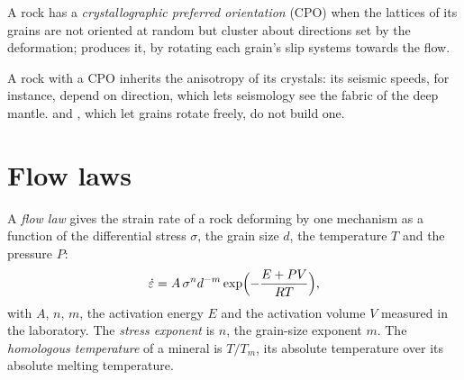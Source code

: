 \begin{definition}\label{def:b3:deformation-mechanisms:cpo}
A rock has a \emph{crystallographic preferred orientation}
(CPO) when the lattices of its grains are not oriented
at random but cluster about directions set by the deformation;  produces it, by rotating each grain's slip systems towards the flow.
\end{definition}

A rock with a CPO inherits the anisotropy of its crystals: its seismic speeds,
for instance, depend on direction, which lets seismology see the fabric of
the deep mantle.  and , which let grains
rotate freely, do not build one.

\section{Flow laws}

\begin{definition}\label{def:b3:deformation-mechanisms:flow-law}
A \emph{flow law} gives the strain rate of a rock deforming by
one mechanism as a function of the differential stress $\sigma$, the grain size
$d$, the temperature $T$ and the pressure $P$:
\[
  \dot\varepsilon = A\,\sigma^nd^{-m}\exp\Bigl(-\frac{E + PV}{RT}\Bigr),
\]
with $A$, $n$, $m$, the activation energy $E$ and the activation volume $V$
measured in the laboratory. The \emph{stress exponent}
is $n$, the grain-size exponent $m$. The \emph{homologous
temperature} of a mineral is $T/T_m$, its
absolute temperature over its absolute melting temperature.
\end{definition}

